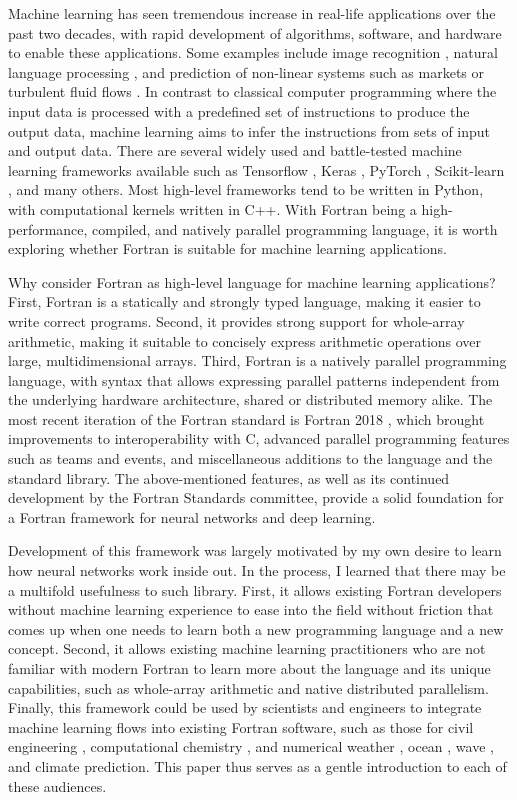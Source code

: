 \documentclass[sigplan, review=false, screen=true, balance=true]{acmart}
\begin{document}
Machine learning has seen tremendous increase in real-life applications
over the past two decades, with rapid development of algorithms, software,
and hardware to enable these applications. Some examples include image
recognition \citep{krizhevsky09}, natural language processing \citep{goldberg16},
and prediction of non-linear systems such as markets \citep{kimoto90} or
turbulent fluid flows \citep{kutz17}.
In contrast to classical computer programming where the input data is processed
with a predefined set of instructions to produce the output data, machine
learning aims to infer the instructions from sets of input and output data.
There are several widely used and battle-tested machine learning frameworks
available such as Tensorflow \citep{abadi16}, Keras \citep{chollet15},
PyTorch \citep{paszke17}, Scikit-learn \citep{pendregosa11}, and many others.
Most high-level frameworks tend to be written in Python, with computational
kernels written in C++. With Fortran being a high-performance, compiled, and
natively parallel programming language, it is worth exploring whether Fortran
is suitable for machine learning applications.

Why consider Fortran as high-level language for machine learning applications?
First, Fortran is a statically and strongly typed language, making it
easier to write correct programs. Second, it provides strong support for whole-array
arithmetic, making it suitable to concisely express arithmetic operations over
large, multidimensional arrays. Third, Fortran is a natively parallel
programming language, with syntax that allows expressing parallel patterns
independent from the underlying hardware architecture, shared or distributed
memory alike. The most recent iteration of the Fortran standard is Fortran 2018
\citep{reid18}, which brought improvements to interoperability with C,
advanced parallel programming features such as teams and events, and
miscellaneous additions to the language and the standard library.
The above-mentioned features, as well as its continued development by
the Fortran Standards committee, provide a solid foundation for a
Fortran framework for neural networks and deep learning.

Development of this framework was largely motivated by my own desire to learn
how neural networks work inside out. In the process, I learned that there
may be a multifold usefulness to such library. First, it allows existing
Fortran developers without machine learning experience to ease into the field
without friction that comes up when one needs to learn both a new programming
language and a new concept.
Second, it allows existing machine learning practitioners who are not
familiar with modern Fortran to learn more about the language and its unique
capabilities, such as whole-array arithmetic and native distributed parallelism.
Finally, this framework could be used by scientists and engineers
to integrate machine learning flows into existing Fortran software, such as
those for civil engineering \citep{fischer08},
computational chemistry \citep{valiev10},
and numerical weather \citep{powers17}, ocean \citep{chassignet06},
wave \citep{donelan12}, and climate \citep{hurell13} prediction.
This paper thus serves as a gentle introduction to each of these audiences.
\end{document}
